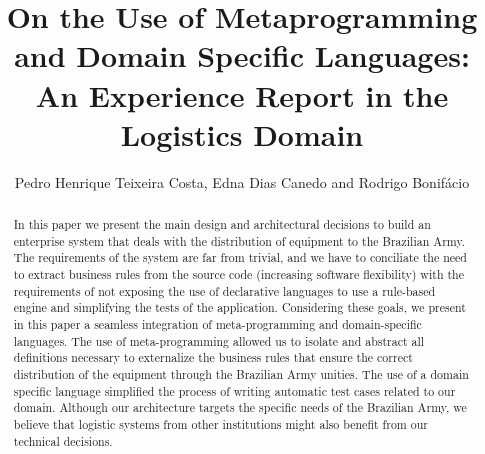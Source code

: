 \documentclass[sigconf]{acmart}
\begin{document}
\title[On the Use of Metaprogramming and DSL: An Experience Report]{On the Use of Metaprogramming and Domain Specific Languages: An Experience Report in the Logistics Domain} 


\author{Pedro Henrique Teixeira Costa, Edna Dias Canedo and Rodrigo Bonif\'{a}cio}

\renewcommand{\shortauthors}{-}

\newcommand{\callers}{\emph{high-level rules}\xspace}
\newcommand{\shc}{HLR\xspace}
\newcommand{\hlrdsl}{\textsc{HLRDsl}\xspace}

\begin{abstract}
In this paper we present the main design and architectural decisions to build an enterprise system that deals with the distribution of equipment to the Brazilian Army. The requirements of the system are far from trivial, and we have to conciliate the need to extract business rules from the source code (increasing software flexibility) with the requirements of not exposing the use of declarative languages to use a rule-based engine and simplifying the tests of the application. Considering these goals, we present in this paper a seamless integration of meta-programming and domain-specific languages. The use of meta-programming allowed us to isolate and abstract all definitions necessary to externalize the business rules that ensure the correct distribution of the equipment through the Brazilian Army unities. The use of a domain specific language simplified the process of writing automatic test cases related to our domain. Although our architecture targets the specific needs of the Brazilian Army, we believe that logistic systems from other institutions might also benefit from our technical decisions.
\end{abstract}
\end{document}
